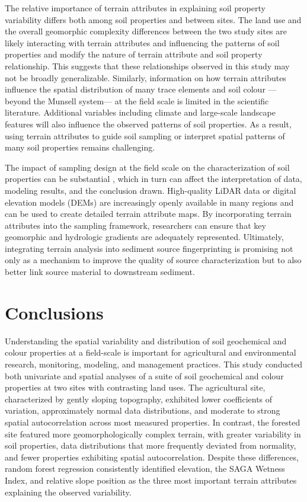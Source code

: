 \documentclass[
  number]{elsarticle}
\begin{document}
The relative importance of terrain attributes in explaining soil
property variability differs both among soil properties and between
sites. The land use and the overall geomorphic complexity differences
between the two study sites are likely interacting with terrain
attributes and influencing the patterns of soil properties and modify
the nature of terrain attribute and soil property relationship. This
suggests that these relationships observed in this study may not be
broadly generalizable. Similarly, information on how terrain attributes
influence the spatial distribution of many trace elements and soil
colour --- beyond the Munsell system--- at the field scale is limited in
the scientific literature. Additional variables including climate and
large-scale landscape features will also influence the observed patterns
of soil properties. As a result, using terrain attributes to guide soil
sampling or interpret spatial patterns of many soil properties remains
challenging.

The impact of sampling design at the field scale on the characterization
of soil properties can be substantial \citep{lunamiño2024}, which in
turn can affect the interpretation of data, modeling results, and the
conclusion drawn. High-quality LiDAR data or digital elevation models
(DEMs) are increasingly openly available in many regions and can be used
to create detailed terrain attribute maps. By incorporating terrain
attributes into the sampling framework, researchers can ensure that key
geomorphic and hydrologic gradients are adequately represented.
Ultimately, integrating terrain analysis into sediment source
fingerprinting is promising not only as a mechanism to improve the
quality of source characterization but to also better link source
material to downstream sediment.

\section{Conclusions}\label{conclusions}

Understanding the spatial variability and distribution of soil
geochemical and colour properties at a field-scale is important for
agricultural and environmental research, monitoring, modeling, and
management practices. This study conducted both univariate and spatial
analyses of a suite of soil geochemical and colour properties at two
sites with contrasting land uses. The agricultural site, characterized
by gently sloping topography, exhibited lower coefficients of variation,
approximately normal data distributions, and moderate to strong spatial
autocorrelation across most measured properties. In contrast, the
forested site featured more geomorphologically complex terrain, with
greater variability in soil properties, data distributions that more
frequently deviated from normality, and fewer properties exhibiting
spatial autocorrelation. Despite these differences, random forest
regression consistently identified elevation, the SAGA Wetness Index,
and relative slope position as the three most important terrain
attributes explaining the observed variability.
\end{document}
